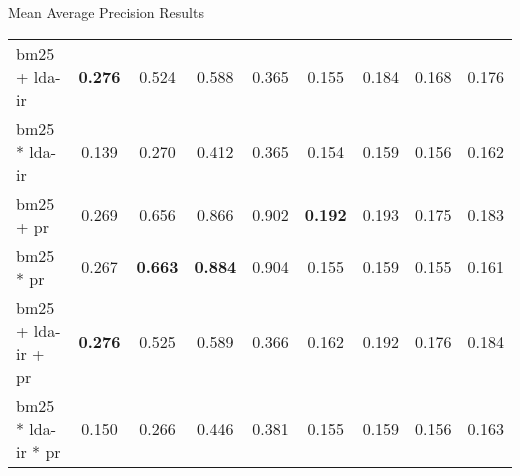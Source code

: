 \begin{frame}{\insertsection}{}
\begin{block}{Mean Average Precision Results}
\begin{table}
{\begin{tabular}{l|c|c|c|c|c|c|c|c}
				\acrshort{bm25} + \acrshort{lda}-\acrshort{ir} & \textbf{0.276} & 0.524 & 0.588 & 0.365 & 0.155 & 0.184 & 0.168 & 0.176 \\
				\acrshort{bm25} * \acrshort{lda}-\acrshort{ir} & 0.139 & 0.270 & 0.412 & 0.365 & 0.154 & 0.159 & 0.156 & 0.162 \\
				\acrshort{bm25} + \acrshort{pr} & 0.269 & 0.656 & 0.866 & 0.902 & \textbf{0.192} & 0.193 & 0.175 & 0.183 \\
				\acrshort{bm25} * \acrshort{pr} & 0.267 & \textbf{0.663} & \textbf{0.884} & 0.904 & 0.155 & 0.159 & 0.155 & 0.161 \\
				\acrshort{bm25} + \acrshort{lda}-\acrshort{ir} + \acrshort{pr} & \textbf{0.276} & 0.525 & 0.589 & 0.366 & 0.162 & 0.192 & 0.176 & 0.184 \\
				\acrshort{bm25} * \acrshort{lda}-\acrshort{ir} * \acrshort{pr} & 0.150 & 0.266 & 0.446 & 0.381 & 0.155 & 0.159 & 0.156 & 0.163 \\
			\end{tabular}
		}
		\end{table}
	\end{block}
\end{frame}

